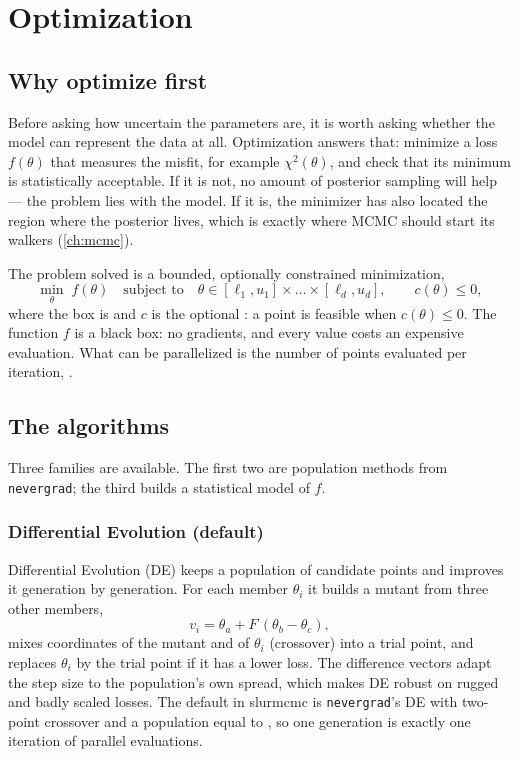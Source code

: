 \chapter{Optimization}
\label{ch:optimization}

\section{Why optimize first}

Before asking how uncertain the parameters are, it is worth asking whether the model can represent
the data at all. Optimization answers that: minimize a loss $f(\theta)$ that measures the misfit,
for example $\chi^2(\theta)$, and check that its minimum is statistically acceptable. If it is not,
no amount of posterior sampling will help --- the problem lies with the model. If it is, the
minimizer has also located the region where the posterior lives, which is exactly where MCMC should
start its walkers (\cref{ch:mcmc}).

The problem solved is a bounded, optionally constrained minimization,
\begin{equation}
  \min_{\theta}\; f(\theta)
  \quad\text{subject to}\quad
  \theta \in [\ell_1, u_1] \times \dots \times [\ell_d, u_d],
  \qquad c(\theta) \le 0,
  \label{eq:minimize}
\end{equation}
where the box is  and $c$ is the optional : a point is
feasible when $c(\theta) \le 0$. The function $f$ is a black box: no gradients, and every value
costs an expensive evaluation. What can be parallelized is the number of points evaluated per
iteration, .

\section{The algorithms}

Three families are available. The first two are population methods from \texttt{nevergrad}; the
third builds a statistical model of $f$.

\subsection{Differential Evolution (default)}

Differential Evolution (DE) keeps a population of candidate points and improves it generation by
generation. For each member $\theta_i$ it builds a mutant from three other members,
\begin{equation}
  v_i = \theta_a + F\,(\theta_b - \theta_c),
\end{equation}
mixes coordinates of the mutant and of $\theta_i$ (crossover) into a trial point, and replaces
$\theta_i$ by the trial point if it has a lower loss. The difference vectors adapt the step size
to the population's own spread, which makes DE robust on rugged and badly scaled losses. The
default in slurmcmc is \texttt{nevergrad}'s DE with two-point crossover and a population equal to
, so one generation is exactly one iteration of parallel evaluations.

